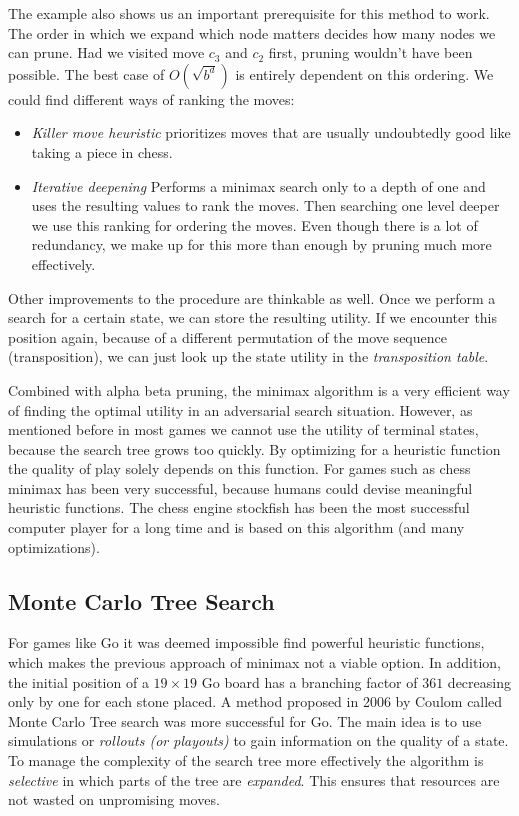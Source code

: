 The example also shows us an important prerequisite for this method to work. The order in which we expand which node matters decides how many nodes we can prune. Had we visited move $ c_3 $ and $ c_2 $ first, pruning wouldn't have been possible. The best case of $ O(\sqrt{b^d}) $ is entirely dependent on this ordering. We could find different ways of ranking the moves:

\begin{itemize}
    \item \textit{Killer move heuristic} prioritizes moves that are usually undoubtedly good like taking a piece in chess.
    \item \textit{Iterative deepening} Performs a minimax search only to a depth of one and uses the resulting values to rank the moves. Then searching one level deeper we use this ranking for ordering the moves. Even though there is a lot of redundancy, we make up for this more than enough by pruning much more effectively.
\end{itemize}

Other improvements to the procedure are thinkable as well. Once we perform a search for a certain state, we can store the resulting utility. If we encounter this position again, because of a different permutation of the move sequence (transposition), we can just look up the state utility in the \textit{transposition table}.

Combined with alpha beta pruning, the minimax algorithm is a very efficient way of finding the optimal utility in an adversarial search situation. However, as mentioned before in most games we cannot use the utility of terminal states, because the search tree grows too quickly. By optimizing for a heuristic function the quality of play solely depends on this function. For games such as chess minimax has been very successful, because humans could devise meaningful heuristic functions. The chess engine stockfish has been the most successful computer player for a long time and is based on this algorithm (and many optimizations). \cite{noauthor_stockfish_2021, noauthor_stockfish_nodate}

\subsection{Monte Carlo Tree Search}
For games like Go it was deemed impossible find powerful heuristic functions, which makes the previous approach of minimax not a viable option. In addition, the initial position of a $19\times19$ Go board has a branching factor of $361$ decreasing only by one for each stone placed. A method proposed in 2006 by Coulom \cite{coulom_efficient_2007} called Monte Carlo Tree search was more successful for Go. The main idea is to use simulations or \textit{rollouts (or playouts)} to gain information on the quality of a state. To manage the complexity of the search tree more effectively the algorithm is \textit{selective} in which parts of the tree are \textit{expanded}. This ensures that resources are not wasted on unpromising moves.

